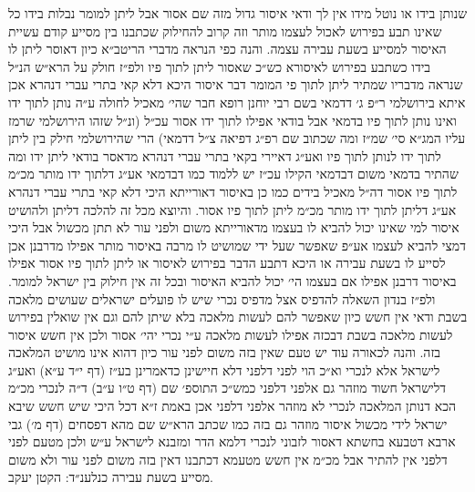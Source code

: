 \documentclass[12pt, openany]{book}
\begin{document}
\begin{multicols}{2}
שנותן בידו או נוטל מידו אין לך ודאי איסור גדול מזה שם אסור אבל ליתן למומר נבלות בידו כל שאינו תבע בפירוש לאכול לעצמו מותר וזה קרוב להחילוק שכתבנו בין מסייע קודם עשיית האיסור למסייע בשעת עבירה עצמה. והנה כפי הנראה מדברי הריטב״א כיון דאוסר ליתן לו בידו כשתבע בפירוש לאיסורא כש״כ שאסור ליתן לתוך פיו ולפ״ז חולק על הרא״ש הנ״ל שנראה מדבריו שמתיר ליתן לתוך פי המומר דבר איסור היכא דלא קאי בתרי עברי דנהרא אכן איתא בירושלמי ר״פ ג׳ דדמאי בשם רבי יוחנן רופא חבר שהי׳ מאכיל לחולה ע״ה נותן לתוך ידו ואינו נותן לתוך פיו בדמאי אבל בודאי אפילו לתוך ידו אסור עכ״ל (ונ״ל שזהו הירושלמי שרמז עליו המג״א סי׳ שמ״ז ומה שכתוב שם רפ״ג דפיאה צ״ל דדמאי) הרי שהירושלמי חילק בין ליתן לתוך ידו לנותן לתוך פיו ואע״ג דאיירי בקאי בתרי עברי דנהרא מדאסר בודאי ליתן ידו ומה שהתיר בדמאי משום דבדמאי הקילו עכ״ז יש ללמוד כמו דבדמאי אע״ג דלתוך ידו מותר מכ״מ לתוך פיו אסור דה״ל מאכיל בידים כמו כן באיסור דאורייתא היכי דלא קאי בתרי עברי דנהרא אע״ג דליתן לתוך ידו מותר מכ״מ ליתן לתוך פיו אסור. והיוצא מכל זה להלכה דליתן ולהושיט איסור למי שאינו יכול להביא לו בעצמו מדאורייתא משום ולפני עור לא תתן מכשול אבל היכי דמצי להביא לעצמו אע״פ שאפשר שעל ידי שמושיט לו מרבה באיסור מותר אפילו מדרבנן אכן לסייע לו בשעת עבירה או היכא דתבע הדבר בפירוש לאיסור או ליתן לתוך פיו אסור אפילו באיסור דרבנן אפילו אם בעצמו הי׳ יכול להביא האיסור ובכל זה אין חילוק בין ישראל למומר. ולפ״ז בנדון השאלה להדפיס אצל מדפיס נכרי שיש לו פועלים ישראלים שעושים מלאכה בשבת ודאי אין חשש כיון שאפשר להם לעשות מלאכה בלא שיתן להם וגם אין שואלין בפירוש לעשות מלאכה בשבת דבכזה אפילו לעשות מלאכה ע״י נכרי יהי׳ אסור ולכן אין חשש איסור בזה. והנה לכאורה עוד יש טעם שאין בזה משום לפני עור כיון דהוא אינו מושיט המלאכה לישראל אלא לנכרי וא״כ הוי לפני דלפני דלא חיישינן כדאמרינן בע״ז (דף י״ד ע״א) ואע״ג דלישראל חשוד מוזהר גם אלפני דלפני כמש״כ התוספ׳ שם (דף ט״ו ע״ב) ד״ה לנכרי מכ״מ הכא דנותן המלאכה לנכרי לא מוזהר אלפני דלפני אכן באמת ז״א דכל היכי שיש חשש שיבא ישראל לידי מכשול איסור מוזהר גם בזה כמו שכתב הרא״ש שם מהא דפסחים (דף מ׳) גבי ארבא דטבעא בחשתא דאסור לזבוני לנכרי דלמא הדר ומזבנא לישראל ע״ש ולכן מטעם לפני דלפני אין להתיר אבל מכ״מ אין חשש מטעמא דכתבנו דאין בזה משום לפני עור ולא משום מסייע בשעת עבירה כנלענ״ד: הקטן יעקב.\\\vspace{0pt}

\end{multicols}\newpage
\end{document}
